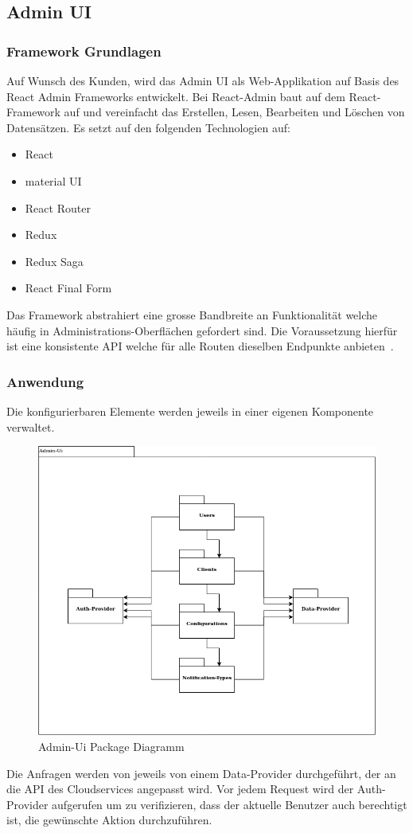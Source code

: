 \subsection{Admin UI}\label{subsec:admin-ui}

\subsubsection{Framework Grundlagen}
Auf Wunsch des Kunden, wird das Admin UI als Web-Applikation auf Basis des React Admin Frameworks entwickelt.
Bei React-Admin baut auf dem React-Framework auf und vereinfacht das Erstellen, Lesen, Bearbeiten und Löschen von Datensätzen.\cite{react-admin}
Es setzt auf den folgenden Technologien auf:
\begin{itemize}
    \item React
    \item material UI
    \item React Router
    \item Redux
    \item Redux Saga
    \item React Final Form
\end{itemize}

Das Framework abstrahiert eine grosse Bandbreite an Funktionalität welche häufig in Administrations-Oberflächen gefordert sind.
Die Voraussetzung hierfür ist eine konsistente API welche für alle Routen dieselben Endpunkte anbieten~\cite{react-admin}.

\subsubsection{Anwendung}
Die konfigurierbaren Elemente werden jeweils in einer eigenen Komponente verwaltet.

\begin{figure}[h]
    \centering
    \label{fig:adminUi-packages}
    \includegraphics[width=.5\linewidth]{graphics/Admin-Ui-export}
    \caption[Admin-Ui Package Diagramm]{Admin-Ui Package Diagramm}
\end{figure}
Die Anfragen werden von jeweils von einem Data-Provider durchgeführt, der an die API des Cloudservices angepasst wird.
Vor jedem Request wird der Auth-Provider aufgerufen um zu verifizieren, dass der aktuelle Benutzer auch berechtigt ist, die gewünschte Aktion durchzuführen.

\clearpage
